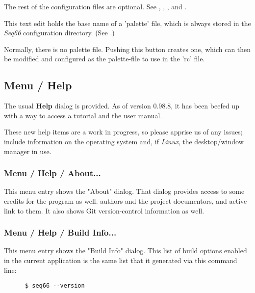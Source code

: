    The rest of the configuration files are optional.
   See
   ,
   ,
   , and
   .

   This text edit holds the base name of a 'palette' file, which is always
   stored in the \textsl{Seq66} configuration directory.
   (See .)

   Normally, there is no palette file.  Pushing this button creates one, which
   can then be modified and configured as the palette-file to use in the 'rc'
   file.

\subsection{Menu / Help}
\label{subsec:menu_help}

   The usual \textbf{Help} dialog is provided.
   As of version 0.98.8, it has been beefed up with a way to access a
   tutorial and the user manual.

   These new help items are a work in progress, so please apprise
   us of any issues; include information on the operating system and,
   if \textsl{Linux}, the desktop/window manager in use.

\subsubsection{Menu / Help / About...}
\label{subsubsec:menu_help_about}

   This menu entry shows the "About" dialog.
   That dialog provides access to some credits for the program as well.
   authors and the project documentors, and active link to them.
   It also shows Git version-control information as well.

\subsubsection{Menu / Help / Build Info...}
\label{subsubsec:menu_help_build_info}

   This menu entry shows the "Build Info" dialog.  This list of
   build options enabled in the current application is the same list
   that it generated via this command line:

   \begin{verbatim}
      $ seq66 --version
   \end{verbatim}

